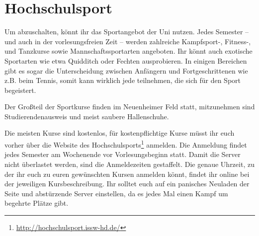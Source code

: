 \section{Hochschulsport}
Um abzuschalten, könnt ihr das Sportangebot der Uni nutzen. Jedes Semester -- und auch in der vorlesungsfreien Zeit -- werden zahlreiche Kampfsport-, Fitness-, und Tanzkurse sowie Mannschaftssportarten angeboten. Ihr könnt auch exotische Sportarten wie etwa Quidditch oder Fechten ausprobieren. In einigen Bereichen gibt es sogar die Unterscheidung zwischen Anfängern und Fortgeschrittenen wie z.B. beim Tennis, somit kann wirklich jede teilnehmen, die sich für den Sport begeistert.

Der Großteil der Sportkurse finden im Neuenheimer Feld statt, mitzunehmen sind Studierendenausweis und meist saubere Hallenschuhe.

Die meisten Kurse sind kostenlos, für kostenpflichtige Kurse müsst ihr euch vorher über die Website des Hochschulsports\footnote{\url{http://hochschulsport.issw-hd.de/}} anmelden. Die Anmeldung findet jedes Semester am Wochenende vor Vorlesungsbeginn statt. Damit die Server nicht überlastet werden, sind die Anmeldezeiten gestaffelt. Die genaue Uhrzeit, zu der ihr euch zu euren gewünschten Kursen anmelden könnt, findet ihr online bei der jeweiligen Kursbeschreibung. Ihr solltet euch auf ein panisches Neuladen der Seite und abstürzende Server einstellen, da es jedes Mal einen Kampf um begehrte Plätze gibt.

